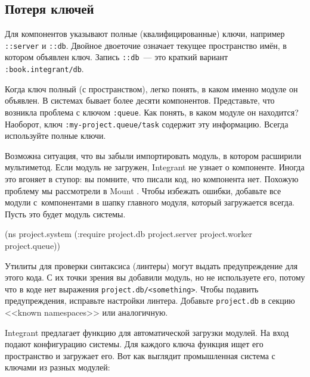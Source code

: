 \fi

\subsection{Потеря ключей}


Для компонентов указывают полные (квалифицированные) ключи, например
\verb|::server| и \verb|::db|. Двойное двоеточие означает текущее пространство
имён, в котором объявлен ключ. Запись \verb|::db|~--- это краткий вариант
\verb|:book.integrant/db|.

Когда ключ полный (с пространством), легко понять, в каком именно модуле он
объявлен. В системах бывает более десяти компонентов. Представьте, что возникла
проблема с ключом \verb|:queue|. Как понять, в каком модуле он находится?
Наоборот, ключ \verb|:my-project.queue/task| содержит эту
информацию. Всегда используйте полные ключи.

Возможна ситуация, что вы забыли импортировать модуль, в котором расширили
мультиметод. Если модуль не загружен, Integrant не узнает о компоненте. Иногда
это вгоняет в ступор: вы помните, что писали код, но компонента нет. Похожую
проблему мы рассмотрели в Mount . Чтобы избежать ошибки,
добавьте все модули с~компонентами в шапку главного модуля, который загружается
всегда. Пусть это будет модуль системы.

\begin{english}
  \begin{clojure}
(ns project.system
  (:require project.db
            project.server
            project.worker
            project.queue))
  \end{clojure}
\end{english}

Утилиты для проверки синтаксиса (линтеры) могут выдать предупреждение для этого
кода. С их точки зрения вы добавили модуль, но не используете его, потому что в
коде нет выражения \verb|project.db/<something>|. Чтобы подавить предупреждения,
исправьте настройки линтера. Добавьте \verb|project.db| в секцию <<known
namespaces>> или аналогичную.


Integrant предлагает функцию  для автоматической загрузки
модулей. На вход подают конфигурацию системы. Для каждого ключа функция ищет его
пространство и загружает его. Вот как выглядит промышленная система с ключами из
разных модулей:

